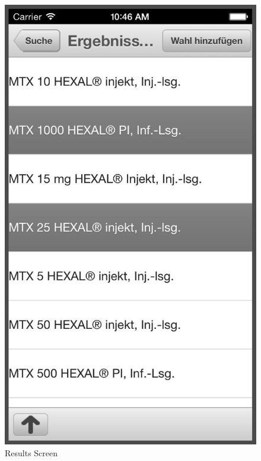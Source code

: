 \begin{figure}[ptb]
\begin{minipage}[b]{0.45\linewidth}
        \includegraphics[width=0.8025\linewidth]{figures/Results_Alt_bw.jpg}
        \caption[List Screen to add to Comparison List]{Results Screen}
        \label{fig:AlternativeListScreen}
    \end{minipage}
\end{figure}
\\
